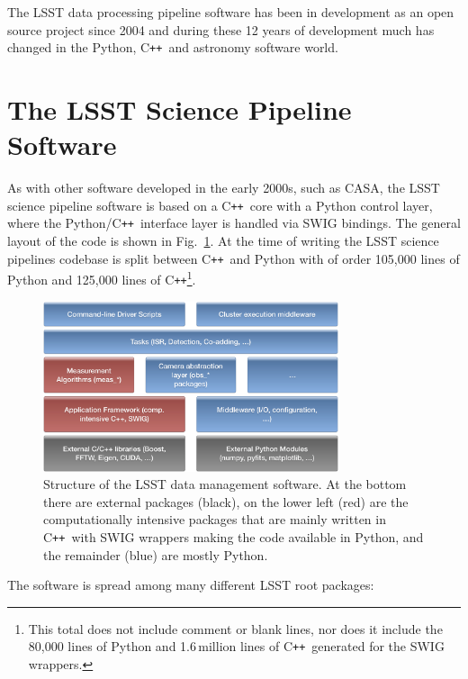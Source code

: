 \documentclass[]{spie}  %
\newcommand{\CPP}{C\texttt{++}\xspace}  %
\begin{document}
The LSST data processing pipeline software has been in development as an open source project since 2004\cite{2004AAS...20510811A,2010SPIE.7740E..15A,2016_adassxxv_P056} and during these 12 years of development much has changed in the Python, \CPP\ and astronomy software world.


\section{The LSST Science Pipeline Software}

As with other software developed in the early 2000s, such as CASA\cite{2012ASPC..461..849P}, the LSST science pipeline software is based on a \CPP\ core with a Python control layer, where the Python/\CPP\ interface layer is handled via SWIG\cite{beazley2003automated} bindings.
The general layout of the code is shown in Fig.~\ref{fig:layers}.
At the time of writing the LSST science pipelines codebase is split between \CPP\ and Python with of order 105,000 lines of Python and 125,000 lines of \CPP\footnote{This total does not include comment or blank lines, nor does it include the 80,000 lines of Python and 1.6\,million lines of \CPP\ generated for the SWIG wrappers.}.

\begin{figure} [t]
\begin{center}
\includegraphics[height=5cm]{Software-Layers}
\end{center}
\caption[layers]
{\label{fig:layers}
Structure of the LSST data management software.
At the bottom there are external packages (black), on the lower left (red) are the computationally intensive packages that are mainly written in \CPP\ with SWIG wrappers making the code available in Python, and the remainder (blue) are mostly Python.}
\end{figure}

The software is spread among many different LSST root packages:
\end{document}

